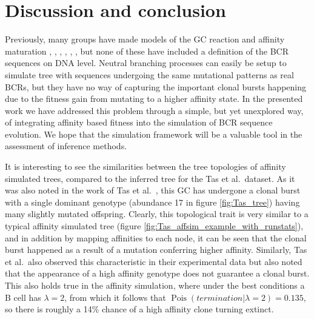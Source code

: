 \clearpage
\section{Discussion and conclusion}
Previously, many groups have made models of the GC reaction and affinity maturation \cite{Reshetova_2017}, \cite{Shahaf_2008}, \cite{Chaudhury_2014}, \cite{Wang_Mata_2015}, \cite{Childs_Baskerville_Cobey_2015}, \cite{robert2017simulate}, but none of these have included a definition of the BCR sequences on DNA level.
Neutral branching processes can easily be setup to simulate tree with sequences undergoing the same mutational patterns as real BCRs, but they have no way of capturing the important clonal bursts happening due to the fitness gain from mutating to a higher affinity state.
In the presented work we have addressed this problem through a simple, but yet unexplored way, of integrating affinity based fitness into the simulation of BCR sequence evolution.
We hope that the simulation framework will be a valuable tool in the assessment of inference methods.

It is interesting to see the similarities between the tree topologies of affinity simulated trees, compared to the inferred tree for the Tas et al.\ dataset.
As it was also noted in the work of Tas et al.\ \cite{tas2016visualizing}, this GC has undergone a clonal burst with a single dominant genotype (abundance 17 in figure \ref{fig:Tas_tree}) having many slightly mutated offspring.
Clearly, this topological trait is very similar to a typical affinity simulated tree (figure \ref{fig:Tas_affsim_example_with_runstats}), and in addition by mapping affinities to each node, it can be seen that the clonal burst happened as a result of a mutation conferring higher affinity.
Similarly, Tas et al.\ also observed this characteristic in their experimental data but also noted that the appearance of a high affinity genotype does not guarantee a clonal burst.
This also holds true in the affinity simulation, where under the best conditions a B cell has $\lambda=2$, from which it follows that $\operatorname{Pois}(termination | \lambda=2) = 0.135$, so there is roughly a 14\% chance of a high affinity clone turning extinct.


